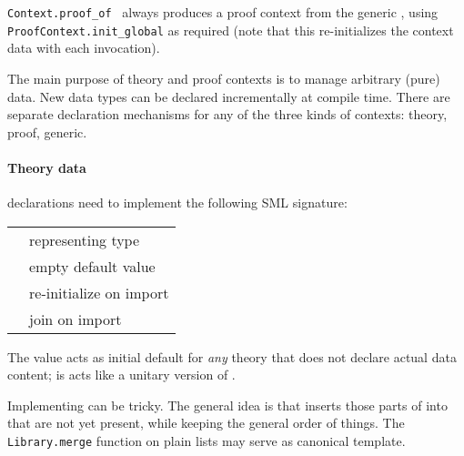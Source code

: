 \begin{isabellebody}
\begin{isamarkuptext}
\begin{description}
  \item \verb|Context.proof_of|~ always produces a
  proof context from the generic , using \verb|ProofContext.init_global| as required (note that this re-initializes the
  context data with each invocation).

  \end{description}%
\end{isamarkuptext}%
\isamarkuptrue%
%
\endisatagmlref
{\isafoldmlref}%
%
\isadelimmlref
%
\endisadelimmlref
%
\isamarkuptrue%
%
\begin{isamarkuptext}%
The main purpose of theory and proof contexts is to manage
  arbitrary (pure) data.  New data types can be declared incrementally
  at compile time.  There are separate declaration mechanisms for any
  of the three kinds of contexts: theory, proof, generic.

  \paragraph{Theory data} declarations need to implement the following
  SML signature:

  \medskip
  \begin{tabular}{ll}
  \isa{{\isasymtype}\ T} & representing type \\
  \isa{{\isasymval}\ empty{\isacharcolon}\ T} & empty default value \\
  \isa{{\isasymval}\ extend{\isacharcolon}\ T\ {\isasymrightarrow}\ T} & re-initialize on import \\
  \isa{{\isasymval}\ merge{\isacharcolon}\ T\ {\isasymtimes}\ T\ {\isasymrightarrow}\ T} & join on import \\
  \end{tabular}
  \medskip

  \noindent The  value acts as initial default for
  \emph{any} theory that does not declare actual data content;  is acts like a unitary version of .

  Implementing  can be tricky.  The general idea is
  that  inserts those parts of  into  that are not yet present, while
  keeping the general order of things.  The \verb|Library.merge|
  function on plain lists may serve as canonical template.


\end{isamarkuptext}
\end{isabellebody}
